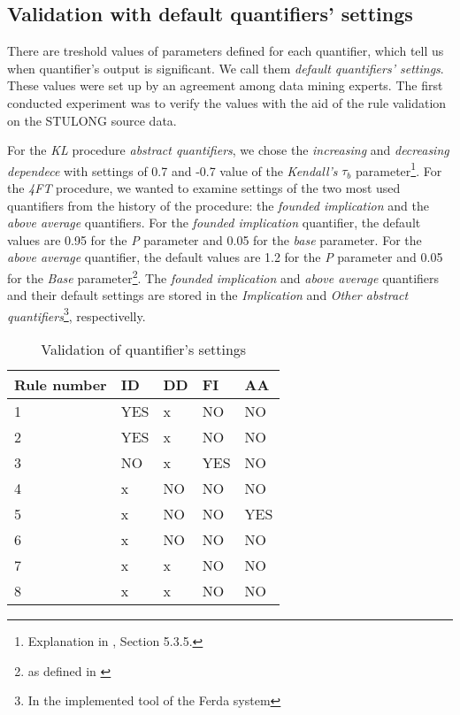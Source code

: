 \documentclass{llncs}
\begin{document}
\subsection{Validation with default quantifiers' settings}
There are treshold values of parameters defined for each quantifier, which tell
us when quantifier's output is significant. We call them \emph{default quantifiers'
settings}. These values were set up by an agreement among data mining experts.
The first conducted experiment was to verify the values with the aid of the rule
validation on the STULONG source data.

For the \emph{KL} procedure \emph{abstract quantifiers}, we chose the 
\emph{increasing} and \emph{decreasing dependece} with settings of 0.7
and -0.7 value of the \emph{Kendall's} $\tau_{b}$ parameter\footnote{Explanation
in \cite{Diplomka}, Section 5.3.5.}. For the \emph{4FT} procedure, we wanted
to examine settings of the two most used quantifiers from the history of the procedure:
the \emph{founded implication} and the \emph{above average} quantifiers. For the
\emph{founded implication} quantifier, the default values are 0.95 for the
\emph{P} parameter and 0.05 for the \emph{base} parameter. For the \emph{above
average} quantifier, the default values are 1.2 for the \emph{P} parameter
and 0.05 for the \emph{Base} parameter\footnote{as defined in \cite{Classes}}. 
The \emph{founded implication} and \emph{above average} quantifiers and their
default settings are stored in the \emph{Implication} and \emph{Other abstract
quantifiers}\footnote{In the implemented tool of the Ferda system}, respectivelly.

\begin{table}[h]
	\centering
	\begin{tabular}{|p{}|p{1cm}|p{1cm}|p{1cm}|p{1cm}|}
		\hline
		\textbf{Rule number}&\textbf{ID}&\textbf{DD}&\textbf{FI}&\textbf{AA}\\
		\hline
		1&YES&x&NO&NO\\
		\hline
		2&YES&x&NO&NO\\
		\hline
		3&NO&x&YES&NO\\
		\hline
		4&x&NO&NO&NO\\
		\hline
		5&x&NO&NO&YES\\
		\hline
		6&x&NO&NO&NO\\
		\hline
		7&x&x&NO&NO\\
		\hline
		8&x&x&NO&NO\\
		\hline
	\end{tabular}
\caption{Validation of quantifier's settings}
\label{tab:validation1}
\end{table}
\end{document}
